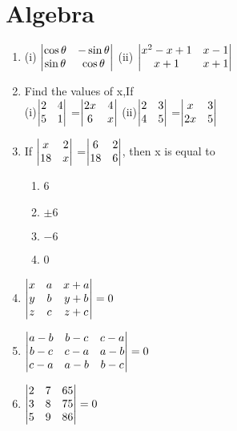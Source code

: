 \documentclass[journal,12pt,twocolumn]{IEEEtran}
\renewcommand\thesection{\arabic{section}}
\begin{document}
\section{Algebra}
\renewcommand{\theequation}{\theenumi}
\begin{enumerate}[label=\thesection.\arabic*.,ref=\thesection.\theenumi]

\item (i) $\begin{vmatrix}\cos\theta& -\sin\theta\\ \sin\theta& \cos\theta \end{vmatrix}$ 
(ii) $\begin{vmatrix}
x^2-x+1& x-1\\ x+1&  x+1
\end{vmatrix}$
\\
\solution 
%
\item Find the values of x,If\\
(i)$\begin{vmatrix}
2&4\\5&1
\end{vmatrix}$ =$\begin{vmatrix}
2x&4 \\ 6&x
\end{vmatrix}$
(ii)$\begin{vmatrix}
2&3 \\ 4&5
\end{vmatrix}$ =$\begin{vmatrix}
x&3 \\ 2x&5
\end{vmatrix}$
\\
\solution 
%
\item If  $\begin{vmatrix}
x&2 \\ 18&x
\end{vmatrix}$ =$\begin{vmatrix}
6&2 \\ 18&6
\end{vmatrix}$, then x is equal to 
\begin{enumerate}
\item 6
\item $\pm 6$
\item $-6$
\item 0
\end{enumerate}
\item $\begin{vmatrix}
x&a&x+a\\y&b&y+b\\z&c&z+c\end{vmatrix}=0$
\\
\solution 
%
\item $\begin{vmatrix}
a-b&b-c&c-a\\b-c&c-a&a-b\\c-a&a-b&b-c\end{vmatrix}=0$
\\
\solution 
%
\item $\begin{vmatrix}2&7&65\\3&8&75\\5&9&86\end{vmatrix}=0$
\\
\solution 
%

\end{enumerate}
\end{document}
